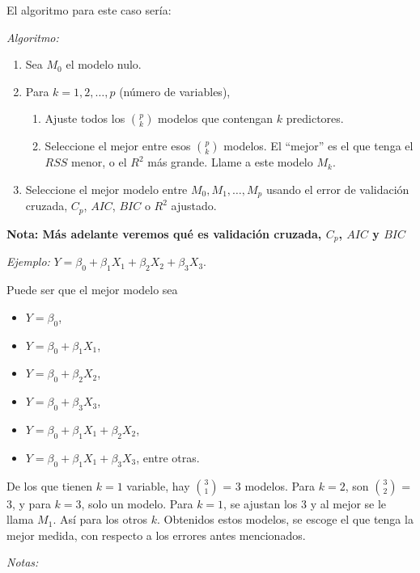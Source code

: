 \documentclass[
  12pt,
]{book}
\providecommand{\tightlist}{%
  \setlength{\itemsep}{0pt}\setlength{\parskip}{0pt}}
\theoremstyle{definition}
\theoremstyle{definition}
\theoremstyle{definition}
\theoremstyle{definition}
\theoremstyle{remark}
\begin{document}
El algoritmo para este caso sería:

\emph{Algoritmo:}

\begin{enumerate}
\def\labelenumi{\arabic{enumi}.}
\item
  Sea \(M_0\) el modelo nulo.
\item
  Para \(k=1,2,\dots,p\) (número de variables),

  \begin{enumerate}
  \def\labelenumii{\alph{enumii}.}
  \tightlist
  \item
    Ajuste todos los \(\binom{p}{k}\) modelos que contengan \(k\) predictores.
  \item
    Seleccione el mejor entre esos \(\binom{p}{k}\) modelos. El ``mejor'' es el que tenga el \(RSS\) menor, o el \(R^2\) más grande. Llame a este modelo \(M_k\).
  \end{enumerate}
\item
  Seleccione el mejor modelo entre \(M_0,M_1,\dots,M_p\) usando el error de validación cruzada, \(C_p\), \(AIC\), \(BIC\) o \(R^2\) ajustado.
\end{enumerate}

\textbf{Nota: Más adelante veremos qué es validación cruzada, \(C_p\), \(AIC\) y \(BIC\)}

\emph{Ejemplo:} \(Y = \beta_0+\beta_1X_1+ \beta_2X_2 + \beta_3X_3\).

Puede ser que el mejor modelo sea

\begin{itemize}
\item
  \(Y = \beta_0\),
\item
  \(Y = \beta_0+\beta_1X_1\),
\item
  \(Y = \beta_0+\beta_2X_2\),
\item
  \(Y = \beta_0+\beta_3X_3\),
\item
  \(Y = \beta_0+\beta_1X_1+\beta_2X_2\),
\item
  \(Y = \beta_0+\beta_1X_1+\beta_3X_3\), entre otras.
\end{itemize}

De los que tienen \(k=1\) variable, hay \(\binom{3}{1}\) = 3 modelos. Para \(k=2\), son \(\binom{3}{2}\) = 3, y para \(k=3\), solo un modelo. Para \(k=1\), se ajustan los 3 y al mejor se le llama \(M_1\). Así para los otros \(k\). Obtenidos estos modelos, se escoge el que tenga la mejor medida, con respecto a los errores antes mencionados.

\emph{Notas:}
\end{document}
